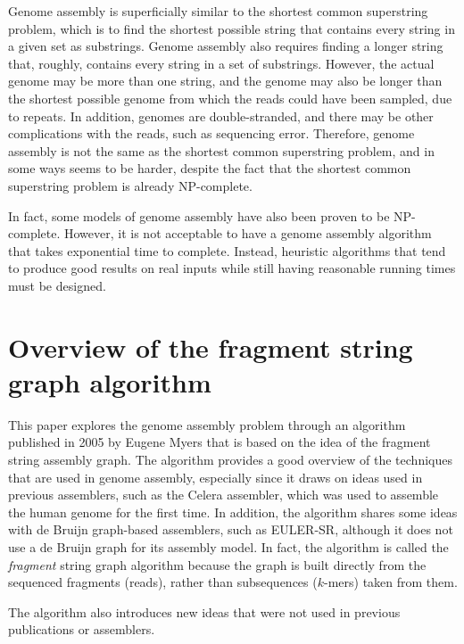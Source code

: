 \documentclass[10pt]{article}
\begin{document}
Genome assembly is superficially similar to the shortest common superstring
problem, which is to find the shortest possible string that contains every
string in a given set as substrings.  Genome assembly also requires finding a
longer string that, roughly, contains every string in  a set of substrings.
However, the actual genome may be more than one string, and the genome may also
be longer than the shortest possible genome from which the reads could have been
sampled, due to repeats.  In addition,  genomes are double-stranded, and there
may be other complications with the reads, such as sequencing error.  Therefore,
genome assembly is not the same as the shortest common superstring problem, and
in some ways seems to be harder, despite the fact that the shortest common
superstring problem is already NP-complete\cite{Turner1989}.

In fact, some models of genome assembly have also been proven to be
NP-complete\cite{Medvedev2007}.  However, it is not acceptable to have a genome
assembly algorithm that takes exponential time to complete.  Instead, heuristic
algorithms that tend to produce good results on real inputs while still having
reasonable running times must be designed.

\section{Overview of the fragment string graph algorithm}

This paper explores the genome assembly problem through an algorithm published
in 2005 by Eugene Myers that is based on the idea of the fragment string
assembly graph\cite{Myers2005}.  The algorithm provides a good overview of the
techniques that are used in genome assembly, especially since it draws on ideas
used in previous assemblers, such as the Celera assembler, which was used to
assemble the human genome for the first time\cite{Venter2001}.  In addition, the
algorithm shares some ideas with de Bruijn graph-based assemblers, such as
EULER-SR\cite{Pevzner2001}, although it does not use a de Bruijn graph for its
assembly model.  In fact, the algorithm is called the {\em fragment} string
graph algorithm because the graph is built directly from the sequenced fragments
(reads), rather than subsequences ($k$-mers) taken from them.

The algorithm also introduces new ideas that were not used in previous
publications or assemblers.
\end{document}
